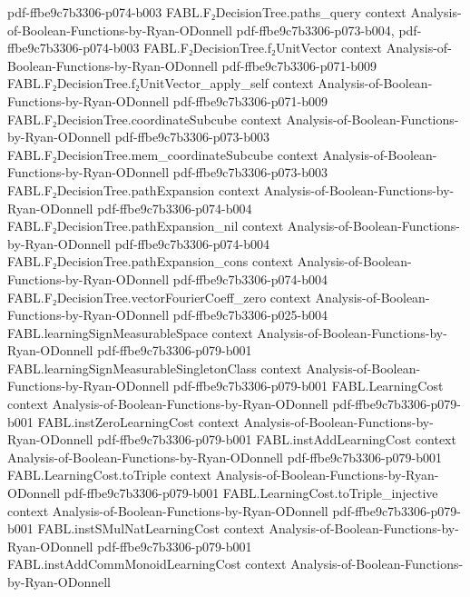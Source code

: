 \begin{theorem}
  {pdf-ffbe9c7b3306-p074-b003}
\proofstep
  {FABL.F₂DecisionTree.paths_query}
  {context}
  {Analysis-of-Boolean-Functions-by-Ryan-ODonnell}
  {pdf-ffbe9c7b3306-p073-b004,
    pdf-ffbe9c7b3306-p074-b003}
\proofstep
  {FABL.F₂DecisionTree.f₂UnitVector}
  {context}
  {Analysis-of-Boolean-Functions-by-Ryan-ODonnell}
  {pdf-ffbe9c7b3306-p071-b009}
\proofstep
  {FABL.F₂DecisionTree.f₂UnitVector_apply_self}
  {context}
  {Analysis-of-Boolean-Functions-by-Ryan-ODonnell}
  {pdf-ffbe9c7b3306-p071-b009}
\proofstep
  {FABL.F₂DecisionTree.coordinateSubcube}
  {context}
  {Analysis-of-Boolean-Functions-by-Ryan-ODonnell}
  {pdf-ffbe9c7b3306-p073-b003}
\proofstep
  {FABL.F₂DecisionTree.mem_coordinateSubcube}
  {context}
  {Analysis-of-Boolean-Functions-by-Ryan-ODonnell}
  {pdf-ffbe9c7b3306-p073-b003}
\proofstep
  {FABL.F₂DecisionTree.pathExpansion}
  {context}
  {Analysis-of-Boolean-Functions-by-Ryan-ODonnell}
  {pdf-ffbe9c7b3306-p074-b004}
\proofstep
  {FABL.F₂DecisionTree.pathExpansion_nil}
  {context}
  {Analysis-of-Boolean-Functions-by-Ryan-ODonnell}
  {pdf-ffbe9c7b3306-p074-b004}
\proofstep
  {FABL.F₂DecisionTree.pathExpansion_cons}
  {context}
  {Analysis-of-Boolean-Functions-by-Ryan-ODonnell}
  {pdf-ffbe9c7b3306-p074-b004}
\proofstep
  {FABL.F₂DecisionTree.vectorFourierCoeff_zero}
  {context}
  {Analysis-of-Boolean-Functions-by-Ryan-ODonnell}
  {pdf-ffbe9c7b3306-p025-b004}
\proofstep
  {FABL.learningSignMeasurableSpace}
  {context}
  {Analysis-of-Boolean-Functions-by-Ryan-ODonnell}
  {pdf-ffbe9c7b3306-p079-b001}
\proofstep
  {FABL.learningSignMeasurableSingletonClass}
  {context}
  {Analysis-of-Boolean-Functions-by-Ryan-ODonnell}
  {pdf-ffbe9c7b3306-p079-b001}
\proofstep
  {FABL.LearningCost}
  {context}
  {Analysis-of-Boolean-Functions-by-Ryan-ODonnell}
  {pdf-ffbe9c7b3306-p079-b001}
\proofstep
  {FABL.instZeroLearningCost}
  {context}
  {Analysis-of-Boolean-Functions-by-Ryan-ODonnell}
  {pdf-ffbe9c7b3306-p079-b001}
\proofstep
  {FABL.instAddLearningCost}
  {context}
  {Analysis-of-Boolean-Functions-by-Ryan-ODonnell}
  {pdf-ffbe9c7b3306-p079-b001}
\proofstep
  {FABL.LearningCost.toTriple}
  {context}
  {Analysis-of-Boolean-Functions-by-Ryan-ODonnell}
  {pdf-ffbe9c7b3306-p079-b001}
\proofstep
  {FABL.LearningCost.toTriple_injective}
  {context}
  {Analysis-of-Boolean-Functions-by-Ryan-ODonnell}
  {pdf-ffbe9c7b3306-p079-b001}
\proofstep
  {FABL.instSMulNatLearningCost}
  {context}
  {Analysis-of-Boolean-Functions-by-Ryan-ODonnell}
  {pdf-ffbe9c7b3306-p079-b001}
\proofstep
  {FABL.instAddCommMonoidLearningCost}
  {context}
  {Analysis-of-Boolean-Functions-by-Ryan-ODonnell}

\end{theorem}
